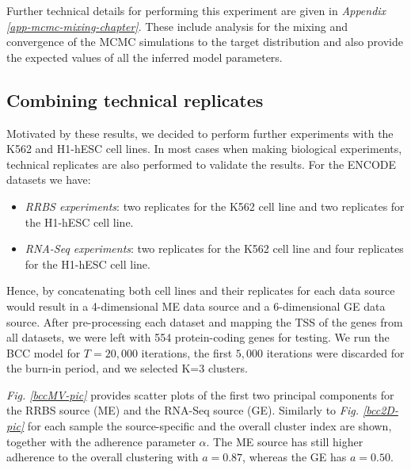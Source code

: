 Further technical details for performing this experiment are given in \emph{Appendix \ref{app-mcmc-mixing-chapter}}. These include analysis for the mixing and convergence of the MCMC simulations to the target distribution and also provide the expected values of all the inferred model parameters.

\subsection*{Combining technical replicates}
Motivated by these results, we decided to perform further experiments with the K562 and H1-hESC cell lines. In most cases when making biological experiments, technical replicates are also performed to validate the results. For the ENCODE datasets we have:
\begin{itemize}
	\item \emph{RRBS experiments}: two replicates for the K562 cell line and two replicates for the H1-hESC cell line.
	\item \emph{RNA-Seq experiments}: two replicates for the K562 cell line and four replicates for the H1-hESC cell line.
\end{itemize}

Hence, by concatenating both cell lines and their replicates for each data source would result in a 4-dimensional ME data source and a 6-dimensional GE data source.  After pre-processing each dataset and mapping the TSS of the genes from all datasets, we were left with 554 protein-coding genes for testing. We run the BCC model for $T=20,000$ iterations, the first $5,000$ iterations were discarded for the burn-in period, and we selected K=3 clusters. 

\emph{Fig. \ref{bccMV-pic}} provides scatter plots of the first two principal components for the RRBS source (ME) and the RNA-Seq source (GE). Similarly to \emph{Fig. \ref{bcc2D-pic}} for each sample the source-specific and the overall cluster index are shown, together with the adherence parameter $\alpha$. The ME source has still higher adherence to the overall clustering with $a=0.87$, whereas the GE has $a=0.50$. 

